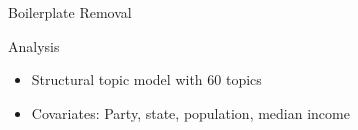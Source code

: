 \documentclass{beamer}
\begin{document}
\begin{frame}[fragile]
\begin{columns}[T]
\begin{column}{.6\textwidth}
\begin{block}{Boilerplate Removal}
\begin{minipage}{\textwidth}
\begin{minipage}[b]{0.49\textwidth}
\begin{figure}
    \end{figure}
  \end{minipage}
  \hfill
  \begin{minipage}[b]{0.49\textwidth}
    
    \end{minipage}
  \end{minipage}
\end{block}
















\begin{block}{Analysis}

\begin{center}
\begin{itemize}
\item Structural topic model with 60 topics
\item Covariates: Party, state, population, median income
\end{itemize}

\vspace{5mm}





\end{center}
\end{block}
\end{column}
\end{columns}
\end{frame}
\end{document}
